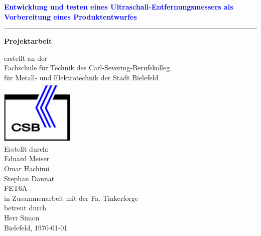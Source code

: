 \begin{center}
\begin{Huge}
\textcolor{blue}{\textbf{Entwicklung und testen eines Ultraschall-Entfernungsmessers als Vorbereitung eines Produktentwurfes}}
\end{Huge}
\rule{\textwidth}{.4pt}
\vspace{1.5cm}

\huge{\textbf{Projektarbeit}}\\
\begin{Large}
erstellt an der\\
Fachschule für Technik des Carl-Severing-Berufskolleg\\
für Metall- und Elektrotechnik der Stadt Bielefeld\\
\includegraphics[width=100pt]{Abbildungen/CSBlogo.png}\\

Erstellt durch:\\
\vspace{12pt}
Eduard Meiser\\Omar Hachimi \\Stephan Dannat\\FET6A\\
\vspace{12pt}
in Zusammenarbeit mit der Fa. Tinkerforge\\
betreut durch\\
Herr Simon\\
Bielefeld, \today
\end{Large}
\end{center}
